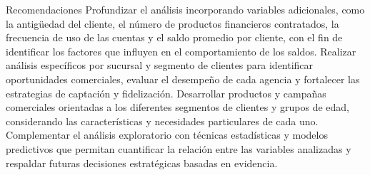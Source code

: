 Recomendaciones
Profundizar el análisis incorporando variables adicionales, como la antigüedad del cliente, el número de productos financieros contratados, la frecuencia de uso de las cuentas y el saldo promedio por cliente, con el fin de identificar los factores que influyen en el comportamiento de los saldos.
Realizar análisis específicos por sucursal y segmento de clientes para identificar oportunidades comerciales, evaluar el desempeño de cada agencia y fortalecer las estrategias de captación y fidelización.
Desarrollar productos y campañas comerciales orientadas a los diferentes segmentos de clientes y grupos de edad, considerando las características y necesidades particulares de cada uno.
Complementar el análisis exploratorio con técnicas estadísticas y modelos predictivos que permitan cuantificar la relación entre las variables analizadas y respaldar futuras decisiones estratégicas basadas en evidencia.